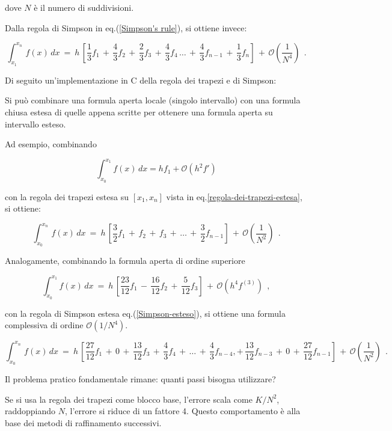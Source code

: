 dove $N$ è il numero di suddivisioni.

Dalla regola di Simpson in eq.(\ref{Simpson's rule}), si ottiene invece:

\begin{equation}\label{Simpson-esteso}
	\int_{x_1}^{x_n}\, f(x)\,dx\ =\ h\, \left[ \frac{1}{3}f_1\,+\,\frac{4}{3}f_2\,+\,\frac{2}{3}f_3\,+\,\frac{4}{3}f_4\,\dots\,+\,\frac{4}{3}f_{n-1}\,+\,\frac{1}{3}f_n\right]
	\,+\,\mathcal{O}\!\left(\frac{1}{N^4}\right)\ \ .
\end{equation} 

Di seguito un'implementazione in C della regola dei trapezi e di Simpson:


Si può combinare una formula aperta locale (singolo intervallo) con una formula chiusa estesa di quelle appena scritte per ottenere una formula aperta su intervallo esteso. 

Ad esempio, combinando

\[
\int_{x_0}^{x_1} f(x)\,dx
=
h f_1 + \mathcal{O}(h^2 f')
\]

con la regola dei trapezi estesa su $[x_1,x_n]$ vista in eq.\ref{regola-dei-trapezi-estesa}, si ottiene:

\[ \int_{x_0}^{x_n}\, f(x)\, dx\ =\ h\, \left[ \frac{3}{2}f_1\, +\, f_2\, +\, f_3\, +\, \dots\, +\, \frac{3}{2}f_{n-1}\right]\,+\, \mathcal{O}\!\left(\frac{1}{N^2}\right)\ \ .\]

Analogamente, combinando la formula aperta di ordine superiore

\[ \int_{x_0}^{x_1} f(x)\,dx \ =\ h\,\left[ \frac{23}{12}f_1\,-\,\frac{16}{12}f_2\,+\,\frac{5}{12}f_3\right]\, +\, \mathcal{O}(h^4 f^{(3)})\ \ , \]

con la regola di Simpson estesa eq.(\ref{Simpson-esteso}), si ottiene una formula complessiva di ordine $\mathcal{O}(1/N^4)$.

\[ \int_{x_0}^{x_n}\, f(x)\, dx\ =\ h\, \left[ \frac{27}{12}f_1\, +\, 0\, +\, \frac{13}{12}f_3\, +\, \frac{4}{3} f_4\, +\,  \dots\, +\, \frac{4}{3}f_{n-4}, +\, \frac{13}{12}f_{n-3}\, +\, 0\, +\, \frac{27}{12}f_{n-1}\right]\,+\, \mathcal{O}\!\left(\frac{1}{N^2}\right)\ \ .\]

\bigskip

Il problema pratico fondamentale rimane: quanti passi bisogna utilizzare?

Se si usa la regola dei trapezi come blocco base, l'errore scala come $\boxed{K/N^2}$, raddoppiando $N$, l'errore si riduce di un fattore 4. Questo comportamento è alla base dei metodi di raffinamento successivi.

